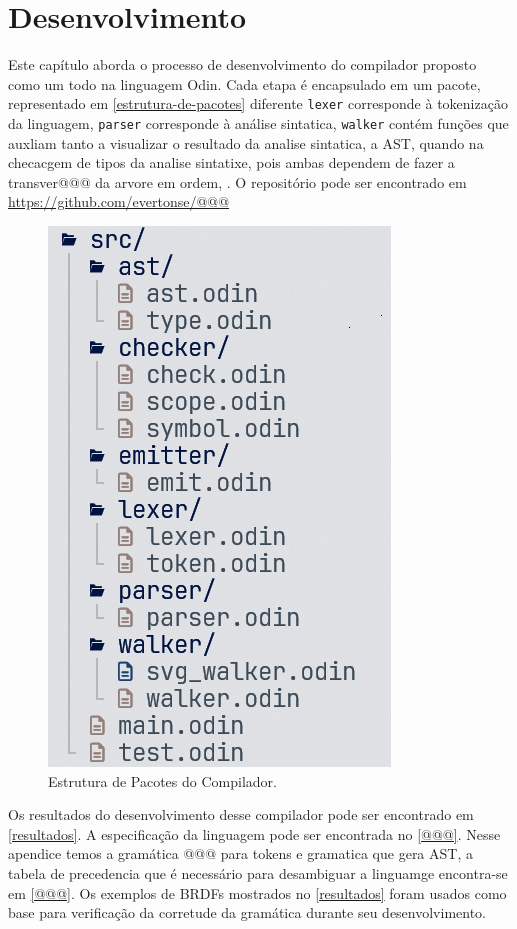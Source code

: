 
\chapter{Desenvolvimento}

Este capítulo aborda o processo de desenvolvimento do compilador proposto como um todo na linguagem Odin.
Cada etapa é encapsulado em um pacote, representado em \autoref{estrutura-de-pacotes} diferente \texttt{lexer} corresponde à tokenização da linguagem, \texttt{parser} corresponde à análise sintatica, \texttt{walker} contém funções que auxliam tanto a visualizar o resultado da analise sintatica, a AST, quando na checacgem de tipos da analise sintatixe, pois ambas dependem de fazer a transver@@@ da arvore em ordem, 
\texttt{}
\texttt{}.
O repositório pode ser encontrado em \url{https://github.com/evertonse/@@@}

\begin{figure}[H]
  \caption{\label{estrutura-de-pacotes} \small Estrutura de Pacotes do Compilador.}
  \begin{center}
    \includegraphics[scale=0.5]{./Imagens/package-structure}
  \end{center}
\end{figure}

Os resultados do desenvolvimento desse compilador pode ser encontrado em \autoref{resultados}.
A especificação da linguagem pode ser encontrada no \autoref{@@@}. Nesse apendice temos a gramática @@@ para tokens e gramatica que gera AST, a tabela de precedencia que é necessário para desambiguar a linguamge encontra-se em \autoref{@@@}.
Os exemplos de BRDFs mostrados no \autoref{resultados} foram usados como base para verificação da corretude da gramática durante seu desenvolvimento. 

